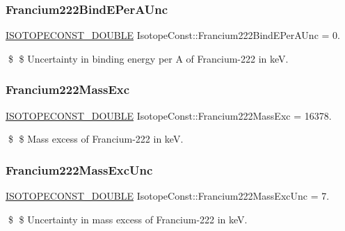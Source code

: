 \subsubsection{\texorpdfstring{Francium222\+Bind\+E\+Per\+A\+Unc}{Francium222BindEPerAUnc}}
{\footnotesize\ttfamily \mbox{\hyperlink{group___isotope_const-_macros_ga8f45a7272ce02c0b4c65c44636ed719a}{I\+S\+O\+T\+O\+P\+E\+C\+O\+N\+S\+T\+\_\+\+D\+O\+U\+B\+LE}} Isotope\+Const\+::\+Francium222\+Bind\+E\+Per\+A\+Unc = 0.}

\$ \$ Uncertainty in binding energy per A of Francium-\/222 in keV. \mbox{\label{group___isotope_const-_francium-_fr222_gaef461265a4898da1ec916a091ed886e8}} 
\subsubsection{\texorpdfstring{Francium222\+Mass\+Exc}{Francium222MassExc}}
{\footnotesize\ttfamily \mbox{\hyperlink{group___isotope_const-_macros_ga8f45a7272ce02c0b4c65c44636ed719a}{I\+S\+O\+T\+O\+P\+E\+C\+O\+N\+S\+T\+\_\+\+D\+O\+U\+B\+LE}} Isotope\+Const\+::\+Francium222\+Mass\+Exc = 16378.}

\$ \$ Mass excess of Francium-\/222 in keV. \mbox{\label{group___isotope_const-_francium-_fr222_ga5b91af809306c12d18a7200fc0ce0e63}} 
\subsubsection{\texorpdfstring{Francium222\+Mass\+Exc\+Unc}{Francium222MassExcUnc}}
{\footnotesize\ttfamily \mbox{\hyperlink{group___isotope_const-_macros_ga8f45a7272ce02c0b4c65c44636ed719a}{I\+S\+O\+T\+O\+P\+E\+C\+O\+N\+S\+T\+\_\+\+D\+O\+U\+B\+LE}} Isotope\+Const\+::\+Francium222\+Mass\+Exc\+Unc = 7.}

\$ \$ Uncertainty in mass excess of Francium-\/222 in keV. \mbox{\label{group___isotope_const-_francium-_fr222_gad498567ced16d84c9e333f971a70a276}} 
